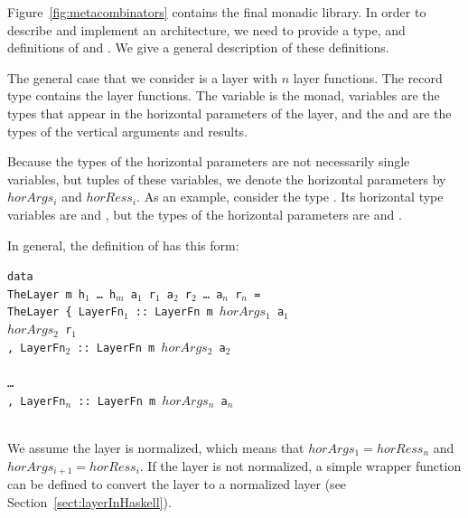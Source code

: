 \documentclass[preprint,natbib]{sigplanconf}
\begin{document}
Figure~\ref{fig:metacombinators} contains the final monadic library. In order to describe and implement an architecture, we need to provide a  type, and definitions of  and . We give a general description of these definitions.




The general case that we consider is a layer with $n$ layer functions. The record type  contains the layer functions. The variable  is the monad, variables  are the types that appear in the horizontal parameters of the layer, and the  and  are the types of the vertical arguments and results. 

Because the types of the horizontal parameters are not necessarily single  variables, but tuples of these variables, we denote the horizontal parameters by $horArgs_i$ and $horRess_i$. As an example, consider the type . Its horizontal  type variables are  and , but the types of the horizontal parameters are  and . 

In general, the definition of  has this form:

\begin{small}
\begin{tabbing}
{\tt da}\={\tt ta}\\
\> {\tt Th}\={\tt eLayer~m h$_1$ \dots ~h$_m$ a$_1$ r$_1$ a$_2$ r$_2$ \dots ~a$_n$ r$_n$ = }\\
\> \> {\tt TheLayer~}\={\tt \{~LayerFn$_1$}\verb| :: |{\tt LayerFn~m~}\= {\tt $horArgs_1$ a$_1$}\\
\> \>                \>                                             \> {\tt $horArgs_2$ r$_1$}\\
\>\>\> {\tt , LayerFn$_2$}\verb| :: |{\tt LayerFn~m~}\={\tt $horArgs_2$ a$_2$}\\
\> \>                \>                            \\
\>\>\> {\tt \dots }\\
\>\>\> {\tt , LayerFn$_n$}\verb| :: |{\tt LayerFn~m~}\={\tt $horArgs_{n}$ a$_n$}\\
\> \>                \>                            \\
\end{tabbing}
\end{small}

We assume the layer is normalized, which means that $horArgs_{1} = horRess_n$ and 
$horArgs_{i+1} = horRess_i$. If the layer is not normalized, a simple wrapper function can be defined to convert the layer to a normalized layer (see Section~\ref{sect:layerInHaskell}). 
\end{document}
